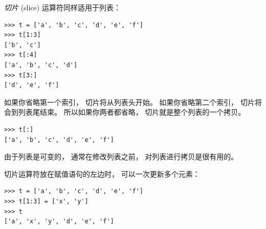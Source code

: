 {\em 切片} (slice) 运算符同样适用于列表：


\begin{lstlisting}
>>> t = ['a', 'b', 'c', 'd', 'e', 'f']
>>> t[1:3]
['b', 'c']
>>> t[:4]
['a', 'b', 'c', 'd']
>>> t[3:]
['d', 'e', 'f']
\end{lstlisting}
%

如果你省略第一个索引， 切片将从列表头开始。  如果你省略第二个索引， 切片将会到列表尾结束。
所以如果你两者都省略， 切片就是整个列表的一个拷贝。
  

\begin{lstlisting}
>>> t[:]
['a', 'b', 'c', 'd', 'e', 'f']
\end{lstlisting}

%

由于列表是可变的， 通常在修改列表之前， 对列表进行拷贝是很有用的。


切片运算符放在赋值语句的左边时， 可以一次更新多个元素：
  

\begin{lstlisting}
>>> t = ['a', 'b', 'c', 'd', 'e', 'f']
>>> t[1:3] = ['x', 'y']
>>> t
['a', 'x', 'y', 'd', 'e', 'f']
\end{lstlisting}

%


%

%


